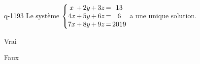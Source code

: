 \begin{truefalse}{q-1193}
Le système $\left\{ \begin{array}{@{} c @{\,}c@{\,} c @{\,}c@{\,} c @{\,}c@{\,} c @{}} x &+& 2y &+& 3z &=& 13 \\ 4x &+& 5y &+& 6z &=& 6 \\ 7x &+& 8y &+& 9z &=& 2019 \end{array} \right.$ a une unique solution.
\item Vrai
\item* Faux
\end{truefalse}


